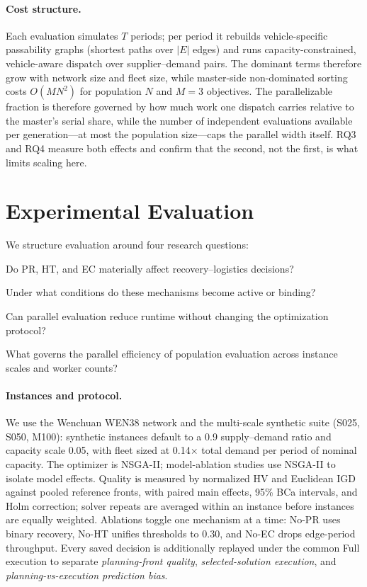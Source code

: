 \documentclass[10pt,conference,letterpaper]{IEEEtran}
\begin{document}
\paragraph{Cost structure.}
Each evaluation simulates $T$ periods; per period it rebuilds
vehicle-specific passability graphs (shortest paths over $|E|$ edges)
and runs capacity-constrained, vehicle-aware dispatch over
supplier--demand pairs. The dominant terms therefore grow with network
size and fleet size, while master-side non-dominated sorting costs
$O(MN^2)$ for population $N$ and $M=3$ objectives. The parallelizable
fraction is therefore governed by how much work one dispatch carries
relative to the master's serial share, while the number of independent
evaluations available per generation---at most the population
size---caps the parallel width itself. RQ3 and RQ4 measure both effects
and confirm that the second, not the first, is what limits scaling here.
\section{Experimental Evaluation}
\label{sec:experiments}

We structure evaluation around four research questions:

\begin{description}[nosep,leftmargin=1.2em]
\item[\textbf{RQ1.}] Do PR, HT, and EC materially affect
recovery--logistics decisions?
\item[\textbf{RQ2.}] Under what conditions do these mechanisms become
active or binding?
\item[\textbf{RQ3.}] Can parallel evaluation reduce runtime without
changing the optimization protocol?
\item[\textbf{RQ4.}] What governs the parallel efficiency of population
evaluation across instance scales and worker counts?
\end{description}

\paragraph{Instances and protocol.}
We use the Wenchuan WEN38 network and the multi-scale synthetic suite
(S025, S050, M100): synthetic instances default to a
0.9 supply--demand ratio and capacity scale 0.05, with fleet sized at
0.14$\times$ total demand per period of nominal capacity. The optimizer
is NSGA-II; model-ablation studies use NSGA-II to isolate model effects.
Quality is measured by normalized HV and Euclidean IGD against pooled
reference fronts, with paired main effects, 95\% BCa intervals, and Holm
correction; solver repeats are averaged within an instance before
instances are equally weighted. Ablations toggle one mechanism at a time:
No-PR uses binary recovery, No-HT unifies thresholds to 0.30, and No-EC
drops edge-period throughput. Every saved decision is additionally
replayed under the common Full execution to separate \emph{planning-front
quality}, \emph{selected-solution execution}, and \emph{planning-vs-execution
prediction bias}.
\end{document}
